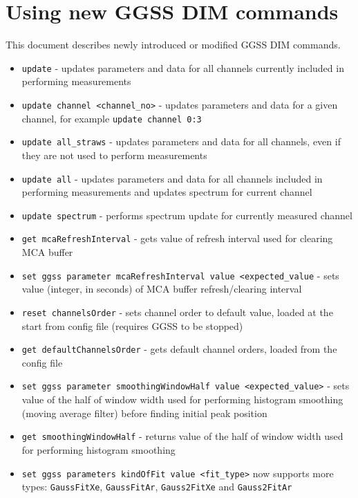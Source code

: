 \clearpage
\section{Using new GGSS DIM commands}
This document describes newly introduced or modified GGSS DIM commands.

\begin{itemize}
    \item \lstinline{update} - updates parameters and data for all channels currently included in performing measurements
    \item \lstinline{update channel <channel_no>} - updates parameters and data for a given channel, for example \lstinline{update channel 0:3}
    \item \lstinline{update all_straws} - updates parameters and data for all channels, even if they are not used to perform measurements
    \item \lstinline{update all} - updates parameters and data for all channels included in performing measurements and updates spectrum for current channel
    \item \lstinline{update spectrum} - performs spectrum update for currently measured channel
    \item \lstinline{get mcaRefreshInterval} - gets value of refresh interval used for clearing MCA buffer
    \item \lstinline{set ggss parameter mcaRefreshInterval value <expected_value} - sets value (integer, in seconds) of MCA buffer refresh/clearing interval
    \item \lstinline{reset channelsOrder} - sets channel order to default value, loaded at the start from config file (requires GGSS to be stopped)
    \item \lstinline{get defaultChannelsOrder} - gets default channel orders, loaded from the config file
    \item \lstinline{set ggss parameter smoothingWindowHalf value <expected_value>} - sets value of the half of window width used for performing histogram smoothing (moving average filter) before finding initial peak position
    \item \lstinline{get smoothingWindowHalf} - returns value of the half of window width used for performing histogram smoothing
    \item \lstinline{set ggss parameters kindOfFit value <fit_type>} now supports more types: \lstinline{GaussFitXe}, \lstinline{GaussFitAr}, \lstinline{Gauss2FitXe} and \lstinline{Gauss2FitAr}
\end{itemize}

